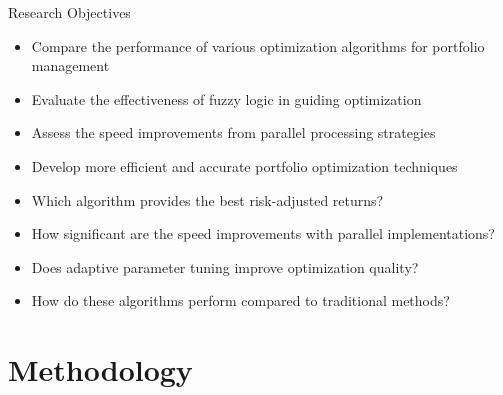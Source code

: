 \documentclass[aspectratio=169,xcolor=table]{beamer}
\begin{document}
\begin{frame}{Research Objectives}
  \begin{tcolorbox}[
    enhanced,
    colback=blue!5,
    colframe=blue!70,
    arc=2mm,
    title=Main Goals,
    fonttitle=\bfseries\large,
    boxrule=0.5mm
  ]
    \begin{itemize}
      \item Compare the performance of various optimization algorithms for portfolio management
      \item Evaluate the effectiveness of fuzzy logic in guiding optimization
      \item Assess the speed improvements from parallel processing strategies
      \item Develop more efficient and accurate portfolio optimization techniques
    \end{itemize}
  \end{tcolorbox}
  
  \vspace{0.5cm}
  
  \begin{tcolorbox}[
    enhanced,
    colback=blue!5,
    colframe=blue!70,
    arc=2mm,
    title=Research Questions,
    fonttitle=\bfseries\large,
    boxrule=0.5mm
  ]
    \begin{itemize}
      \item Which algorithm provides the best risk-adjusted returns?
      \item How significant are the speed improvements with parallel implementations?
      \item Does adaptive parameter tuning improve optimization quality?
      \item How do these algorithms perform compared to traditional methods?
    \end{itemize}
  \end{tcolorbox}
\end{frame}

\section{Methodology}
\end{document}
